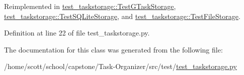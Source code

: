\-Reimplemented in \hyperlink{classtest__taskstorage_1_1TestGTaskStorage_abb748de83f5fdbc145f7570464fe13b7}{test\-\_\-taskstorage\-::\-Test\-G\-Task\-Storage}, \hyperlink{classtest__taskstorage_1_1TestSQLiteStorage_ae03503042105ca995288e3128553870b}{test\-\_\-taskstorage\-::\-Test\-S\-Q\-Lite\-Storage}, and \hyperlink{classtest__taskstorage_1_1TestFileStorage_af65fc75e8b921b475ea610cf3681e270}{test\-\_\-taskstorage\-::\-Test\-File\-Storage}.



\-Definition at line 22 of file test\-\_\-taskstorage.\-py.



\-The documentation for this class was generated from the following file\-:\begin{DoxyCompactItemize}
\item 
/home/scott/school/capstone/\-Task-\/\-Organizer/src/test/\hyperlink{test__taskstorage_8py}{test\-\_\-taskstorage.\-py}\end{DoxyCompactItemize}
